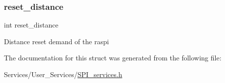 \subsubsection{\texorpdfstring{reset\+\_\+distance}{reset\_distance}}
{\footnotesize\ttfamily int reset\+\_\+distance}

Distance reset demand of the raspi 

The documentation for this struct was generated from the following file\+:\begin{DoxyCompactItemize}
\item 
Services/\+User\+\_\+\+Services/\hyperlink{_s_p_i__services_8h}{S\+P\+I\+\_\+services.\+h}\end{DoxyCompactItemize}
